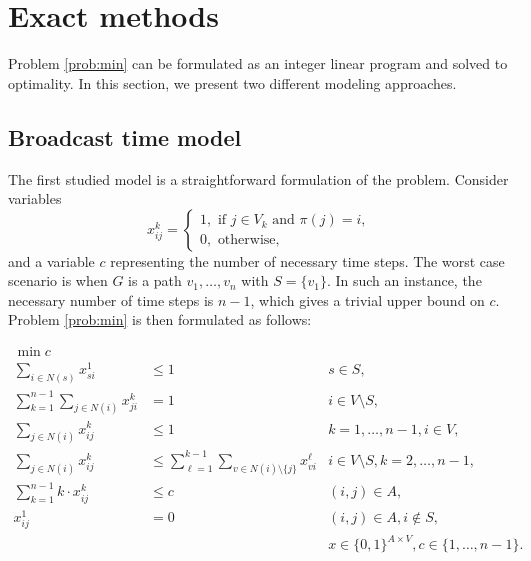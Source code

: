 \section{Exact methods}

Problem \ref{prob:min} can be formulated as an integer linear program and solved to optimality. In this section, we present two different modeling approaches. 

\subsection{Broadcast time model}
The first studied model is a straightforward formulation of the problem.
Consider variables 
$$ x_{ij}^k=
\begin{cases} 
1, \text{ if } j\in V_k \text{ and } \pi(j)=i,\\ 
0, \text{ otherwise},
\end{cases}
$$
and a variable $c$ representing the number of necessary time steps.
The worst case scenario is when $G$ is a path $v_1,\dots,v_n$ with $S=\{v_1\}$. 
In such an instance, the necessary number of time steps is $n-1$, which gives a trivial upper bound on $c$.
Problem \ref{prob:min} is then formulated as follows: 

\begin{subequations}\label{mod:basic}
\begin{align}
\label{mod:basic:obj} \min c \\ 
\label{mod:basic:onefromroot} \sum_{i \in N(s)}x^1_{si} & \leq 1 & s\in S,\\
\label{mod:basic:singlein} \sum\limits_{k=1}^{n-1}\sum\limits_{j\in N(i)}x_{ji}^k & = 1 & i\in V \setminus S,\\
\label{mod:basic:uniqueTout} \sum\limits_{j\in N(i)}x_{ij}^k & \leq 1  & k=1,\dots,n-1,i\in V,\\
\label{mod:basic:tIncreases} \sum\limits_{j\in N(i)}x_{ij}^k &\leq\sum\limits_{\ell=1}^{k-1}\sum\limits_{v\in N(i)\setminus\{j\}} x_{vi}^{\ell}  & i\in V\setminus S, k=2,\dots,n-1,\\
\label{mod:basic:tcrel} \sum\limits_{k=1}^{n-1}k\cdot x_{ij}^k & \leq c &  (i,j)\in A,\\
\label{mod:basic:positiveCost}x_{ij}^1 & = 0 & (i,j)\in A, i \not\in S,\\
\label{mod:basic:dim}&&x \in \{0,1\}^{A\times V}, c \in\{1,\dots,n-1\}.
\end{align}~
\end{subequations}

